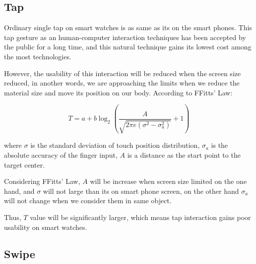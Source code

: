 \subsection{Tap}

Ordinary single tap on smart watches is as same as its on the smart phones.
This tap gesture as an human-computer interaction techniques has been accepted by the public for a long time, and this natural technique gains its lowest cost among the most technologies.

However, the usability of this interaction will be reduced when the screen size reduced, in another words, we are approaching the limits when we reduce the material size and move its position on our body. According to FFitts' Law\cite{Bi:2013:FLM:2470654.2466180}:

\begin{equation}
T=a+b\log_{2}{\left(\frac{A}{\sqrt{2\pi e(\sigma^2-\sigma_{a}^2)}}+1 \right)}
\end{equation}

where $\sigma$ is the standard deviation of touch position distribution, $\sigma_a$ is the absolute accuracy of the finger input, $A$ is a distance as the start point to the target center.

Considering FFitts' Law, $A$ will be increase when screen size limited on the one hand, and $\sigma$ will not large than its on smart phone screen, on the other hand $\sigma_a$ will not change when we consider them in same object.

Thus, $T$ value will be significantly larger, which means tap interaction gains poor usability on smart watches.

\subsection{Swipe}

